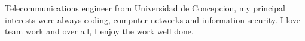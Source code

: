\par{
    Telecommunications engineer from Universidad de Concepcion, my principal interests were always coding, computer networks and information security. I love team work and over all, I enjoy the work well done.
}